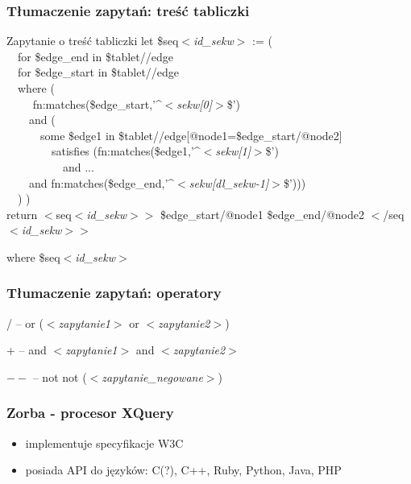 \begin{frame}
 \frametitle{Tłumaczenie zapytań: treść tabliczki}
  \begin{block}{Zapytanie o treść tabliczki}
	let \$seq\textit{$<$id\_sekw$>$} := (\\
  ~~for \$edge\_end in \$tablet//edge\\
  ~~for \$edge\_start in \$tablet//edge\\
~~where (\\
~~~~ fn:matches(\$edge\_start,'\textasciicircum \textit{$<$sekw[0]$>$}\$')\\
~~~~and (\\
~~~~~~some \$edge1 in \$tablet//edge[@node1=\$edge\_start/@node2]\\
~~~~~~~~satisfies (fn:matches(\$edge1,'\textasciicircum \textit{$<$sekw[1]$>$}\$')\\
~~~~~~~~~~and ... \\
~~~~and fn:matches(\$edge\_end,'\textasciicircum \textit{$<$sekw[dl\_sekw-1]$>$}\$')))\\
~~) )\\
return $<$seq\textit{$<$id\_sekw$>$}$>$ {\$edge\_start/@node1} {\$edge\_end/@node2} $<$/seq\textit{$<$id\_sekw$>$}$>$
\end{block}
\begin{block}{where}
	\$seq\textit{$<$id\_sekw$>$}
\end{block}
\end{frame}





\begin{frame}
 \frametitle{Tłumaczenie zapytań: operatory}
\begin{block}{/ -- or}
(\textit{$<$zapytanie1$>$} or \textit{$<$zapytanie2$>$})\\
\end{block}
\begin{block}{+ -- and}
\textit{$<$zapytanie1$>$} and \textit{$<$zapytanie2$>$}\\
\end{block}
\begin{block}{$--$ -- not}
not (\textit{$<$zapytanie\_negowane$>$})\\
\end{block}
\end{frame}

\begin{frame}
 \frametitle{Zorba - procesor XQuery}
\begin{itemize}
\item implementuje specyfikacje W3C
\item posiada API do języków: C(?), C++, Ruby, Python, Java, PHP
\end{itemize}
 \end{frame}

